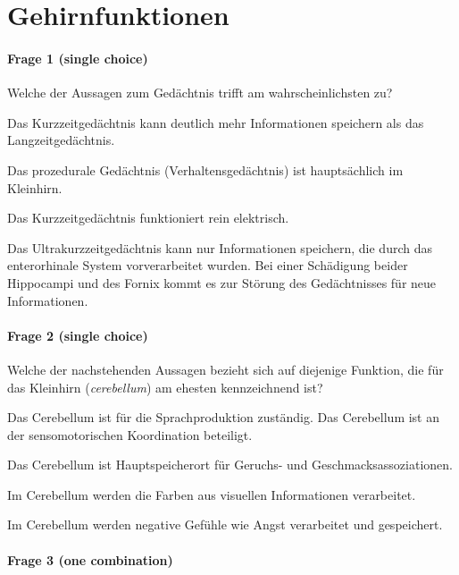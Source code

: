 \section*{Gehirnfunktionen}

\paragraph{Frage 1 (single choice)}

Welche der Aussagen zum Gedächtnis trifft am wahrscheinlichsten zu?

\begin{benumerate}
  \item Das Kurzzeitgedächtnis kann deutlich mehr Informationen speichern als das Langzeitgedächtnis.
  \item Das prozedurale Gedächtnis (Verhaltensgedächtnis) ist hauptsächlich im Kleinhirn.
  \item Das Kurzzeitgedächtnis funktioniert rein elektrisch.
  \item Das Ultrakurzzeitgedächtnis kann nur Informationen speichern, die durch das enterorhinale System vorverarbeitet wurden.
  \bolditem Bei einer Schädigung beider Hippocampi und des Fornix kommt es zur Störung des Gedächtnisses für neue Informationen.
\end{benumerate}

\paragraph{Frage 2 (single choice)}

Welche der nachstehenden Aussagen bezieht sich auf diejenige Funktion, die für das Kleinhirn (\emph{cerebellum}) am ehesten kennzeichnend ist?
\begin{benumerate}
  \item Das Cerebellum ist für die Sprachproduktion zuständig.
  \bolditem Das Cerebellum ist an der sensomotorischen Koordination beteiligt.
  \item Das Cerebellum ist Hauptspeicherort für Geruchs- und Geschmacksassoziationen.
  \item Im Cerebellum werden die Farben aus visuellen Informationen verarbeitet.
  \item Im Cerebellum werden negative Gefühle wie Angst verarbeitet und gespeichert.
\end{benumerate}

\paragraph{Frage 3 (one combination)}

